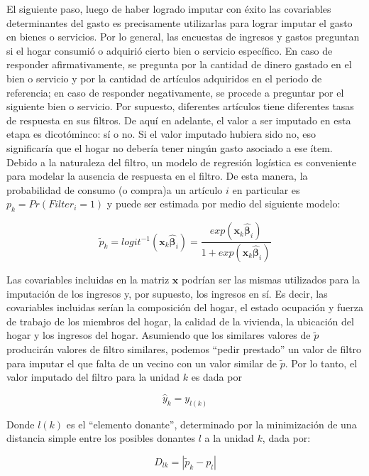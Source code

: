 El siguiente paso, luego de haber logrado imputar con éxito las covariables determinantes del gasto es precisamente utilizarlas para lograr imputar el gasto en bienes o servicios. Por lo general, las encuestas de ingresos y gastos preguntan si el hogar consumió o adquirió cierto bien o servicio específico. En caso de responder afirmativamente, se pregunta por la cantidad de dinero gastado en el bien o servicio y por la cantidad de artículos adquiridos en el periodo de referencia; en caso de responder negativamente, se procede a preguntar por el siguiente bien o servicio. Por supuesto, diferentes artículos tiene diferentes tasas de respuesta en sus filtros. De aquí en adelante, el valor a ser imputado en esta etapa es dicotóminco: sí o no. Si el valor imputado hubiera sido no, eso significaría que el hogar no debería tener ningún gasto asociado a ese ítem. Debido a la naturaleza del filtro, un modelo de regresión logística es conveniente para modelar la ausencia de respuesta en el filtro. De esta manera, la probabilidad de consumo (o compra)a un artículo \(i\) en particular es \(p_k = Pr(Filter_i = 1)\) y puede ser estimada por medio del siguiente modelo:

\[
\tilde{p}_k = logit^{-1}(\mathbf{x}_k \hat{\boldsymbol{\beta}}_i) =
\frac{exp(\mathbf{x}_k \hat{\boldsymbol{\beta}}_i)}{1+exp(\mathbf{x}_k \hat{\boldsymbol{\beta}}_i)}
\]

Las covariables incluidas en la matriz \(\mathbf{x}\) podrían ser las mismas utilizados para la imputación de los ingresos y, por supuesto, los ingresos en sí. Es decir, las covariables incluidas serían la composición del hogar, el estado ocupación y fuerza de trabajo de los miembros del hogar, la calidad de la vivienda, la ubicación del hogar y los ingresos del hogar. Asumiendo que los similares valores de \(\tilde p\) producirán valores de filtro similares, podemos ``pedir prestado'' un valor de filtro para imputar el que falta de un vecino con un valor similar de \(\tilde p\). Por lo tanto, el valor imputado del filtro para la unidad \(k\) es dada por

\[\hat{y}_k = y_{l(k)}\]

Donde \(l(k)\) es el ``elemento donante'', determinado por la minimización de una distancia simple entre los posibles donantes \(l\) a la unidad \(k\), dada por:

\[
D_{lk} = |\tilde p_k - p_l|
\]

